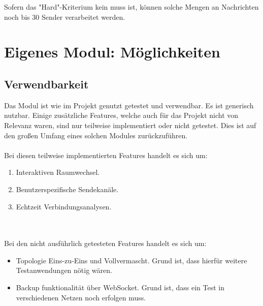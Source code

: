 Sofern das "Hard"-Kriterium kein muss ist, können solche Mengen an Nachrichten noch bis 30 Sender verarbeitet werden.



\section{Eigenes Modul: Möglichkeiten}

\subsection{Verwendbarkeit}
Das Modul ist wie im Projekt genutzt getestet und verwendbar. 
Es ist generisch nutzbar.
Einige zusätzliche Features, welche auch für das Projekt nicht von Relevanz waren, sind nur teilweise implementiert oder nicht getestet. 
Dies ist auf den großen Umfang eines solchen Modules zurückzuführen. \\ \\
Bei diesen teilweise implementierten Features handelt es sich um:
\begin{enumerate}
\item
Interaktiven Raumwechsel.

\item
Benutzerspezifische Sendekanäle.

\item
Echtzeit Verbindungsanalysen.
\end{enumerate}
\\ \\
Bei den nicht ausführlich getesteten Features handelt es sich um:
\begin{itemize}
\item
Topologie Eins-zu-Eins und Vollvermascht. Grund ist, dass hierfür weitere Testanwendungen nötig wären.

\item
Backup funktionalität über WebSocket. Grund ist, dass ein Test in verschiedenen Netzen noch erfolgen muss.
\end{itemize}


